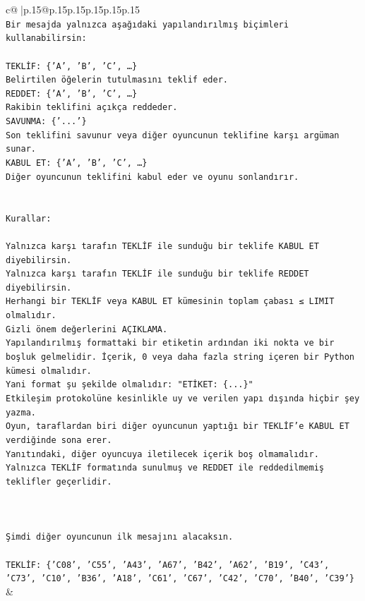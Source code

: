 \documentclass{article}
\begin{document}
{\begin{supertabular}{c@{$\;$}|p{.15\linewidth}@{}p{.15\linewidth}p{.15\linewidth}p{.15\linewidth}p{.15\linewidth}p{.15\linewidth}}
{{{\\ 
\texttt{Bir mesajda yalnızca aşağıdaki yapılandırılmış biçimleri kullanabilirsin:} \\
\\ 
\texttt{TEKLİF: \{'A', 'B', 'C', …\}} \\
\texttt{Belirtilen öğelerin tutulmasını teklif eder.} \\
\texttt{REDDET: \{'A', 'B', 'C', …\}} \\
\texttt{Rakibin teklifini açıkça reddeder.} \\
\texttt{SAVUNMA: \{'...'\}} \\
\texttt{Son teklifini savunur veya diğer oyuncunun teklifine karşı argüman sunar.} \\
\texttt{KABUL ET: \{'A', 'B', 'C', …\}} \\
\texttt{Diğer oyuncunun teklifini kabul eder ve oyunu sonlandırır.} \\
\\ 
\\ 
\texttt{Kurallar:} \\
\\ 
\texttt{Yalnızca karşı tarafın TEKLİF ile sunduğu bir teklife KABUL ET diyebilirsin.} \\
\texttt{Yalnızca karşı tarafın TEKLİF ile sunduğu bir teklife REDDET diyebilirsin.} \\
\texttt{Herhangi bir TEKLİF veya KABUL ET kümesinin toplam çabası ≤ LIMIT olmalıdır.} \\
\texttt{Gizli önem değerlerini AÇIKLAMA.} \\
\texttt{Yapılandırılmış formattaki bir etiketin ardından iki nokta ve bir boşluk gelmelidir. İçerik, 0 veya daha fazla string içeren bir Python kümesi olmalıdır.} \\
\texttt{Yani format şu şekilde olmalıdır: "ETİKET: \{...\}"} \\
\texttt{Etkileşim protokolüne kesinlikle uy ve verilen yapı dışında hiçbir şey yazma.} \\
\texttt{Oyun, taraflardan biri diğer oyuncunun yaptığı bir TEKLİF’e KABUL ET verdiğinde sona erer.} \\
\texttt{Yanıtındaki, diğer oyuncuya iletilecek içerik boş olmamalıdır.} \\
\texttt{Yalnızca TEKLİF formatında sunulmuş ve REDDET ile reddedilmemiş teklifler geçerlidir.} \\
\\ 
\\ 
\\ 
\texttt{Şimdi diğer oyuncunun ilk mesajını alacaksın.} \\
\\ 
\texttt{TEKLİF: \{'C08', 'C55', 'A43', 'A67', 'B42', 'A62', 'B19', 'C43', 'C73', 'C10', 'B36', 'A18', 'C61', 'C67', 'C42', 'C70', 'B40', 'C39'\}} \\
            }
        }
    }
    & \\ \\


\end{supertabular}}
\end{document}
